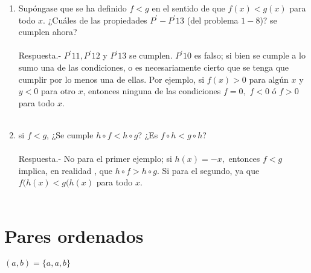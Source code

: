 \begin{enumerate}[\bfseries 1.]
\begin{enumerate}[\bfseries (a)]
	    \item Supóngase que se ha definido $f<g$ en el sentido de que $f(x)<g(x)$ para todo $x$. ¿Cuáles de las propiedades $P^{'}-P^{'}13$ (del problema $1-8$)? se cumplen ahora?\\\\
		Respuesta.-\; $P^{'} 11, P^{'} 12$ y $P^{'}13$ se cumplen. $P^{'}10$ es falso; si bien se cumple a lo sumo una de las condiciones, o es necesariamente cierto que se tenga que cumplir por lo menos una de ellas. Por ejemplo, si $f(x)>0$ para algún $x$ y $y<0$ para otro $x$, entonces ninguna de las condiciones $f=0,$ $f<0$ ó $f>0$ para todo $x$.\\\\

	    \item si $f<g$, ¿Se cumple $h\circ f < h \circ g$? ¿Es $f\circ h<g\circ h$?\\\\
		Respuesta.-\; No para el primer ejemplo; si $h(x)=-x,$ entonces $f<g$ implica, en realidad , que $h\circ f > h \circ g$. Si para el segundo, ya que $f(h(x)<g(h(x)$ para todo $x$.\\\\

	\end{enumerate}

    \end{enumerate}

\section{Pares ordenados}
    
	\begin{def.}
	    $(a,b) = \lbrace {a},{a,b} \rbrace$\\
	\end{def.}

